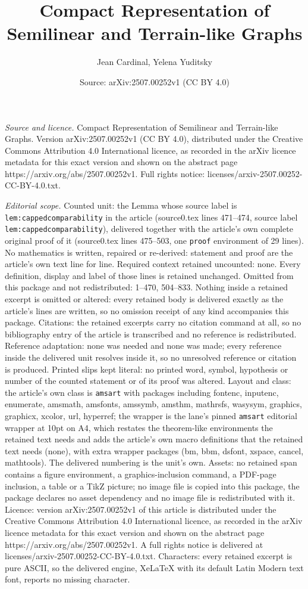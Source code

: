 \documentclass[10pt,a4paper]{amsart}
\title[Compact Representation of Semilinear and Terrain-like Graphs]{Compact Representation of Semilinear and Terrain-like Graphs}
\author{Jean Cardinal, Yelena Yuditsky}
\date{Source: arXiv:2507.00252v1 (CC BY 4.0)}
\begin{document}
\maketitle

\noindent\emph{Source and licence.} Compact Representation of Semilinear and Terrain-like Graphs. Version arXiv:2507.00252v1 (CC BY 4.0), distributed under the Creative Commons Attribution 4.0 International licence, as recorded in the arXiv licence metadata for this exact version and shown on the abstract page https://arxiv.org/abs/2507.00252v1. Full rights notice: licenses/arxiv-2507.00252-CC-BY-4.0.txt.\par\smallskip

\noindent\textit{Editorial scope.} Counted unit: the Lemma whose source label is \texttt{lem:cappedcomparability} in the article (source0.tex lines 471--474, source label \texttt{lem:cappedcomparability}), delivered together with the article's own complete original proof of it (source0.tex lines 475--503, one \texttt{proof} environment of 29 lines). No mathematics is written, repaired or re-derived: statement and proof are the article's own text line for line. Required context retained uncounted: none. Every definition, display and label of those lines is retained unchanged. Omitted from this package and not redistributed: 1--470, 504--833. Nothing inside a retained excerpt is omitted or altered: every retained body is delivered exactly as the article's lines are written, so no omission receipt of any kind accompanies this package. Citations: the retained excerpts carry no citation command at all, so no bibliography entry of the article is transcribed and no reference is redistributed. Reference adaptation: none was needed and none was made; every reference inside the delivered unit resolves inside it, so no unresolved reference or citation is produced. Printed slips kept literal: no printed word, symbol, hypothesis or number of the counted statement or of its proof was altered. Layout and class: the article's own class is \texttt{amsart} with packages including fontenc, inputenc, enumerate, amsmath, amsfonts, amssymb, amsthm, mathrsfs, wasysym, graphics, graphicx, xcolor, url, hyperref; the wrapper is the lane's pinned \texttt{amsart} editorial wrapper at 10pt on A4, which restates the theorem-like environments the retained text needs and adds the article's own macro definitions that the retained text needs (none), with extra wrapper packages (bm, bbm, dsfont, xspace, cancel, mathtools). The delivered numbering is the unit's own. Assets: no retained span contains a figure environment, a graphics-inclusion command, a PDF-page inclusion, a table or a TikZ picture; no image file is copied into this package, the package declares no asset dependency and no image file is redistributed with it. Licence: version arXiv:2507.00252v1 of this article is distributed under the Creative Commons Attribution 4.0 International licence, as recorded in the arXiv licence metadata for this exact version and shown on the abstract page https://arxiv.org/abs/2507.00252v1. A full rights notice is delivered at licenses/arxiv-2507.00252-CC-BY-4.0.txt. Characters: every retained excerpt is pure ASCII, so the delivered engine, XeLaTeX with its default Latin Modern text font, reports no missing character.
\end{document}
